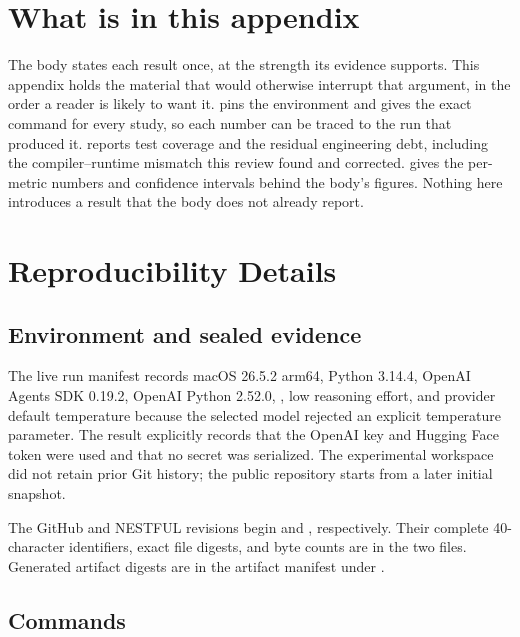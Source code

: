\section*{What is in this appendix}

The body states each result once, at the strength its evidence supports.  This appendix
holds the material that would otherwise interrupt that argument, in the order a reader is
likely to want it.   pins the environment and gives the exact command for
every study, so each number can be traced to the run that produced it.  
reports test coverage and the residual engineering debt, including the compiler--runtime
mismatch this review found and corrected.   gives the
per-metric numbers and confidence intervals behind the body's figures.
Nothing here introduces a result that the body does not already report.

\section{Reproducibility Details}
\label{app:repro}

\subsection{Environment and sealed evidence}

The live run manifest records macOS 26.5.2 arm64, Python 3.14.4, OpenAI Agents SDK
0.19.2, OpenAI Python 2.52.0, , low reasoning effort, and provider
default temperature because the selected model rejected an explicit temperature
parameter.  The result explicitly records that the OpenAI key and Hugging Face token were
used and that no secret was serialized.  The experimental workspace did not retain prior
Git history; the public repository starts from a later initial snapshot.

The GitHub and NESTFUL revisions begin  and
, respectively.  Their complete 40-character identifiers, exact file
digests, and byte counts are in the two  files.  Generated
artifact digests are in the artifact manifest under .

\subsection{Commands}


